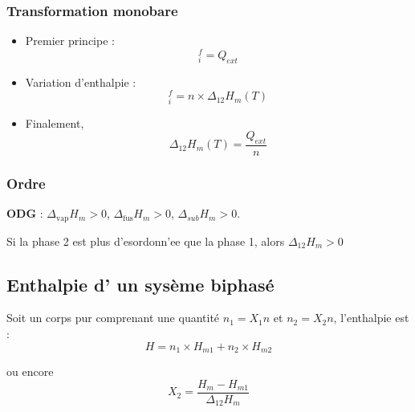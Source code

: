 \subsubsection{Transformation monobare} %
\label{sec:Transformation monobare}
\begin{itemize}

    \item Premier principe : 
      \begin{equation}
        [H] _i ^{f} = Q _{ext}
      \end{equation}

    \item Variation d'enthalpie : 
      \begin{equation}
        [H] _i ^{f} = n \times\Delta _{12} H_m(T)
      \end{equation}

    \item Finalement,
      \begin{equation}
        \Delta _{12}H_m(T) = \frac{
          Q _{ext}
        }{n} 
      \end{equation}

\end{itemize}
\subsubsection{Ordre} %
\label{sec:Ordre}

\textbf{ODG} : $\Delta _{\text{vap}}H_m >0$, $\Delta _{\text{fus}}H_m >0$, $\Delta _{sub} H_m >0$.

Si la phase 2 est plus d'esordonn'ee que la phase 1, alors $\Delta _{12}H_m >0$


\subsection{Enthalpie d' un sysème biphasé} %
\label{sub:Enthalpie d' un sysème biphasé}

Soit un corps pur comprenant une quantité $n_1 = X_1n$ et $n_2 = X_2n$, l'enthalpie est :
\begin{equation}
  \boxed{H = n_1 \times H _{m1} + n_2 \times H _{m2}}
\end{equation}

ou encore 
\begin{equation}
  X_2 = \frac{H_m - H _{m1}}{\Delta _{12}H_m} 
\end{equation}


